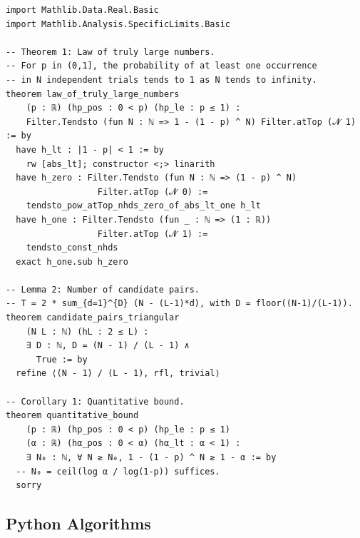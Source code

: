 \documentclass[11pt]{amsart}
\theoremstyle{plain}
\theoremstyle{remark}
\begin{document}
\begin{lstlisting}[style=lean]
import Mathlib.Data.Real.Basic
import Mathlib.Analysis.SpecificLimits.Basic

-- Theorem 1: Law of truly large numbers.
-- For p in (0,1], the probability of at least one occurrence
-- in N independent trials tends to 1 as N tends to infinity.
theorem law_of_truly_large_numbers
    (p : ℝ) (hp_pos : 0 < p) (hp_le : p ≤ 1) :
    Filter.Tendsto (fun N : ℕ => 1 - (1 - p) ^ N) Filter.atTop (𝓝 1) := by
  have h_lt : |1 - p| < 1 := by
    rw [abs_lt]; constructor <;> linarith
  have h_zero : Filter.Tendsto (fun N : ℕ => (1 - p) ^ N)
                  Filter.atTop (𝓝 0) :=
    tendsto_pow_atTop_nhds_zero_of_abs_lt_one h_lt
  have h_one : Filter.Tendsto (fun _ : ℕ => (1 : ℝ))
                  Filter.atTop (𝓝 1) :=
    tendsto_const_nhds
  exact h_one.sub h_zero

-- Lemma 2: Number of candidate pairs.
-- T = 2 * sum_{d=1}^{D} (N - (L-1)*d), with D = floor((N-1)/(L-1)).
theorem candidate_pairs_triangular
    (N L : ℕ) (hL : 2 ≤ L) :
    ∃ D : ℕ, D = (N - 1) / (L - 1) ∧
      True := by
  refine ⟨(N - 1) / (L - 1), rfl, trivial⟩

-- Corollary 1: Quantitative bound.
theorem quantitative_bound
    (p : ℝ) (hp_pos : 0 < p) (hp_le : p ≤ 1)
    (α : ℝ) (hα_pos : 0 < α) (hα_lt : α < 1) :
    ∃ N₀ : ℕ, ∀ N ≥ N₀, 1 - (1 - p) ^ N ≥ 1 - α := by
  -- N₀ = ceil(log α / log(1-p)) suffices.
  sorry
\end{lstlisting}

\subsection{Python Algorithms}
\end{document}
